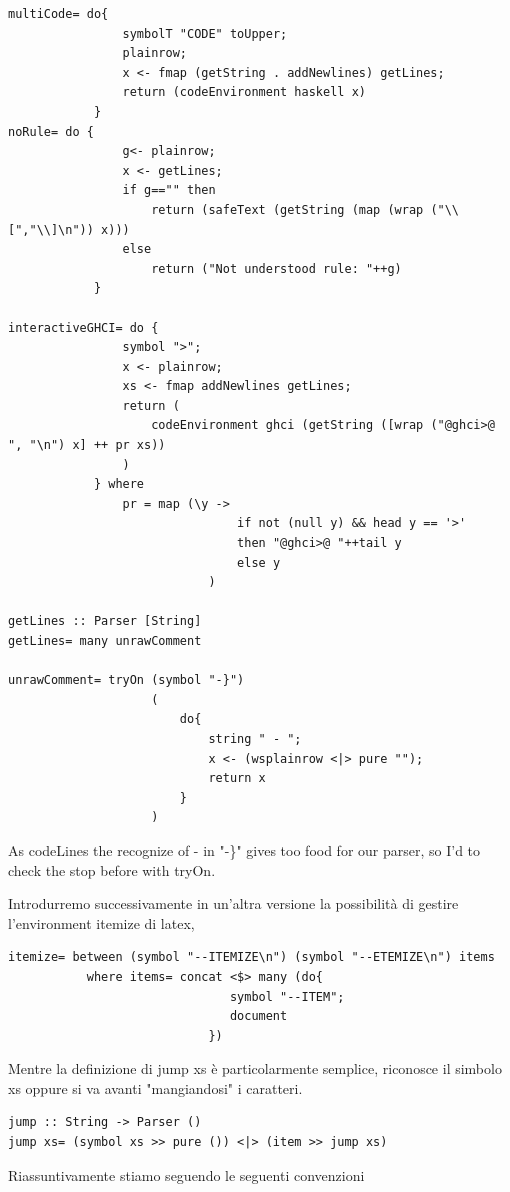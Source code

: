 \documentclass[a4papert]{article}
\begin{document}
\begin{lstlisting}[style=haskellstyle]
multiCode= do{
                symbolT "CODE" toUpper;
                plainrow;
                x <- fmap (getString . addNewlines) getLines;
                return (codeEnvironment haskell x)
            }
noRule= do {
                g<- plainrow;
                x <- getLines;
                if g=="" then
                    return (safeText (getString (map (wrap ("\\[","\\]\n")) x)))
                else
                    return ("Not understood rule: "++g)
            }

interactiveGHCI= do {
                symbol ">";
                x <- plainrow;
                xs <- fmap addNewlines getLines;
                return (
                    codeEnvironment ghci (getString ([wrap ("@ghci>@ ", "\n") x] ++ pr xs))
                )
            } where
                pr = map (\y ->
                                if not (null y) && head y == '>'
                                then "@ghci>@ "++tail y
                                else y
                            )

getLines :: Parser [String]
getLines= many unrawComment

unrawComment= tryOn (symbol "-}")
                    (
                        do{
                            string " - ";
                            x <- (wsplainrow <|> pure "");
                            return x
                        }
                    )
\end{lstlisting}
As codeLines the recognize of - in "-\}" gives too food for our parser, so I'd to check the stop before with tryOn.

Introdurremo successivamente in un'altra versione la possibilità di gestire l'environment itemize di latex,

\begin{lstlisting}[style=haskellstyle]
itemize= between (symbol "--ITEMIZE\n") (symbol "--ETEMIZE\n") items
           where items= concat <$> many (do{
                               symbol "--ITEM";
                               document
                            })
\end{lstlisting}


Mentre la definizione di jump xs è particolarmente semplice, riconosce il simbolo xs oppure si va avanti "mangiandosi" i caratteri.

\begin{lstlisting}[style=haskellstyle]
jump :: String -> Parser ()
jump xs= (symbol xs >> pure ()) <|> (item >> jump xs)

\end{lstlisting}
Riassuntivamente stiamo seguendo le seguenti convenzioni
\end{document}
